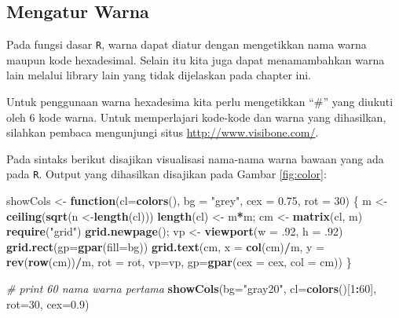 \documentclass[]{book}
\newenvironment{Shaded}{\begin{snugshade}}{\end{snugshade}}
\newcommand{\CommentTok}[1]{\textcolor[rgb]{0.56,0.35,0.01}{\textit{#1}}}
\newcommand{\ControlFlowTok}[1]{\textcolor[rgb]{0.13,0.29,0.53}{\textbf{#1}}}
\newcommand{\DataTypeTok}[1]{\textcolor[rgb]{0.13,0.29,0.53}{#1}}
\newcommand{\DecValTok}[1]{\textcolor[rgb]{0.00,0.00,0.81}{#1}}
\newcommand{\FloatTok}[1]{\textcolor[rgb]{0.00,0.00,0.81}{#1}}
\newcommand{\KeywordTok}[1]{\textcolor[rgb]{0.13,0.29,0.53}{\textbf{#1}}}
\newcommand{\NormalTok}[1]{#1}
\newcommand{\OperatorTok}[1]{\textcolor[rgb]{0.81,0.36,0.00}{\textbf{#1}}}
\newcommand{\StringTok}[1]{\textcolor[rgb]{0.31,0.60,0.02}{#1}}
\theoremstyle{definition}
\theoremstyle{definition}
\theoremstyle{definition}
\theoremstyle{remark}
\begin{document}
\hypertarget{changecolor}{%
\subsection{Mengatur Warna}\label{changecolor}}

Pada fungsi dasar \texttt{R}, warna dapat diatur dengan mengetikkan nama warna maupun kode hexadesimal. Selain itu kita juga dapat menamambahkan warna lain melalui library lain yang tidak dijelaskan pada chapter ini.

Untuk penggunaan warna hexadesima kita perlu mengetikkan ``\#'' yang diukuti oleh 6 kode warna. Untuk memperlajari kode-kode dan warna yang dihasilkan, silahkan pembaca mengunjungi situs \url{http://www.visibone.com/}.

Pada sintaks berikut disajikan visualisasi nama-nama warna bawaan yang ada pada \texttt{R}. Output yang dihasilkan disajikan pada Gambar \ref{fig:color}:

\begin{Shaded}
\begin{Highlighting}[]
\NormalTok{showCols <-}\StringTok{ }\ControlFlowTok{function}\NormalTok{(}\DataTypeTok{cl=}\KeywordTok{colors}\NormalTok{(), }\DataTypeTok{bg =} \StringTok{"grey"}\NormalTok{,}
                     \DataTypeTok{cex =} \FloatTok{0.75}\NormalTok{, }\DataTypeTok{rot =} \DecValTok{30}\NormalTok{) \{}
\NormalTok{    m <-}\StringTok{ }\KeywordTok{ceiling}\NormalTok{(}\KeywordTok{sqrt}\NormalTok{(n <-}\KeywordTok{length}\NormalTok{(cl)))}
    \KeywordTok{length}\NormalTok{(cl) <-}\StringTok{ }\NormalTok{m}\OperatorTok{*}\NormalTok{m; cm <-}\StringTok{ }\KeywordTok{matrix}\NormalTok{(cl, m)}
    \KeywordTok{require}\NormalTok{(}\StringTok{"grid"}\NormalTok{)}
    \KeywordTok{grid.newpage}\NormalTok{(); vp <-}\StringTok{ }\KeywordTok{viewport}\NormalTok{(}\DataTypeTok{w =} \FloatTok{.92}\NormalTok{, }\DataTypeTok{h =} \FloatTok{.92}\NormalTok{)}
    \KeywordTok{grid.rect}\NormalTok{(}\DataTypeTok{gp=}\KeywordTok{gpar}\NormalTok{(}\DataTypeTok{fill=}\NormalTok{bg))}
    \KeywordTok{grid.text}\NormalTok{(cm, }\DataTypeTok{x =} \KeywordTok{col}\NormalTok{(cm)}\OperatorTok{/}\NormalTok{m, }\DataTypeTok{y =} \KeywordTok{rev}\NormalTok{(}\KeywordTok{row}\NormalTok{(cm))}\OperatorTok{/}\NormalTok{m, }\DataTypeTok{rot =}\NormalTok{ rot,}
              \DataTypeTok{vp=}\NormalTok{vp, }\DataTypeTok{gp=}\KeywordTok{gpar}\NormalTok{(}\DataTypeTok{cex =}\NormalTok{ cex, }\DataTypeTok{col =}\NormalTok{ cm))}
\NormalTok{\}}

\CommentTok{# print 60 nama warna pertama}
\KeywordTok{showCols}\NormalTok{(}\DataTypeTok{bg=}\StringTok{"gray20"}\NormalTok{, }\DataTypeTok{cl=}\KeywordTok{colors}\NormalTok{()[}\DecValTok{1}\OperatorTok{:}\DecValTok{60}\NormalTok{], }\DataTypeTok{rot=}\DecValTok{30}\NormalTok{, }\DataTypeTok{cex=}\FloatTok{0.9}\NormalTok{)}
\end{Highlighting}
\end{Shaded}
\end{document}
